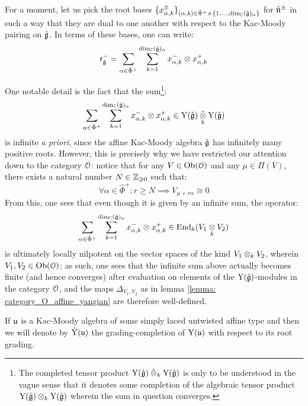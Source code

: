         \begin{remark}
            For a moment, let us pick the root bases $\{ x_{\alpha, k}^{\pm} \}_{(\alpha, k) \in \hat{\Phi}^+ \x \{1, ..., \dim_{\bbC} (\hat{\g})_{\alpha} \}}$ for $\hat{\mathfrak{n}}^{\pm}$ in such a way that they are dual to one another with respect to the Kac-Moody pairing on $\hat{\mathfrak{g}}$. In terms of these bases, one can write:
                $$\sfr_{\hat{\g}}^- = \sum_{\alpha \in \hat{\Phi}^+} \sum_{k = 1}^{ \dim_{\bbC} (\hat{\g})_{\alpha} } x_{\alpha, k}^- \tensor x_{\alpha, k}^+$$
        
            One notable detail is the fact that the sum\footnote{The completed tensor product $\rmY(\hat{\g}) \hattensor_k \rmY(\hat{\g})$ is only to be understood in the vague sense that it denotes some completion of the algebraic tensor product $\rmY(\hat{\g}) \tensor_k \rmY(\hat{\g})$ wherein the sum in question converges.}:
                $$\sum_{\alpha \in \hat{\Phi}^+} \sum_{k = 1}^{ \dim_{\bbC} (\hat{\g})_{\alpha} } x_{\alpha, k}^- \tensor x_{\alpha, k}^+ \in \rmY(\hat{\g}) \hattensor_k \rmY(\hat{\g})$$
            is infinite \textit{a priori}, since the affine Kac-Moody algebra $\hat{\mathfrak{g}}$ has infinitely many positive roots. However, this is precisely why we have restricted our attention down to the category $\mathcal{O}$: notice that for any $V \in \mathrm{Ob}(\mathcal{O})$ and any $\mu \in \Pi(V)$, there exists a natural number $N \in \mathbb{Z}_{\geqslant 0}$ such that:
                $$\forall \alpha \in \hat{\Phi}^+: r \geq N \implies V_{\mu + r \alpha} \cong 0$$
            From this, one sees that even though it is given by an infinite sum, the operator:
                $$\sum_{\alpha \in \hat{\Phi}^+} \sum_{k = 1}^{ \dim_{\bbC} (\hat{\g})_{\alpha} } x_{\alpha, k}^- \tensor x_{\alpha, k}^+ \in \End_k(V_1 \tensor_k V_2)$$
            is ultimately locally nilpotent on the vector spaces of the kind $V_1 \tensor_k V_2$, wherein $V_1, V_2 \in \mathrm{Ob}(\mathcal{O})$; as such, one sees that the infinite sum above actually becomes finite (and hence converges) after evaluation on elements of the $\mathrm{Y}(\hat{\mathfrak{g}})$-modules in the category $\mathcal{O}$, and the maps $\Delta_{V_1, V_2}$ as in lemma \ref{lemma: category_O_affine_yangian} are therefore well-defined. 
        \end{remark}
        \begin{convention}
            If $\mathfrak{u}$ is a Kac-Moody algebra of some simply laced untwisted affine type and then we will denote by $\hat{\mathrm{Y}}(\mathfrak{u})$ the grading-completion of $\mathrm{Y}(\mathfrak{u})$ with respect to its root grading.
        \end{convention}
